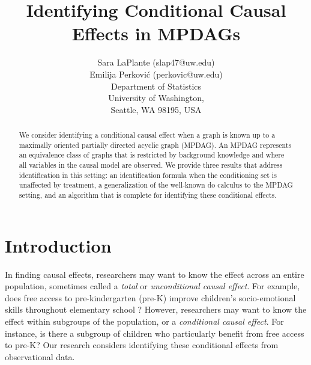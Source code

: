 \documentclass[11pt]{article}
\begin{document}
\title{Identifying Conditional Causal Effects in MPDAGs}

\author{Sara LaPlante  (slap47@uw.edu) \\
         Emilija Perkovi\'c  (perkovic@uw.edu) \\
         Department of Statistics\\
              University of Washington,\\
              Seattle, WA 98195, USA}
\date{}

\maketitle






\begin{abstract}%
    We consider identifying a conditional causal effect when a graph is known up to a maximally oriented partially directed acyclic graph (MPDAG). An MPDAG represents an equivalence class of graphs that is restricted by background knowledge and where all variables in the causal model are observed. We provide three results that address identification in this setting: an identification formula when the conditioning set is unaffected by treatment, a generalization of the well-known do calculus to the MPDAG setting, and an algorithm that is complete for identifying these conditional effects.
\end{abstract}







\section{Introduction}
\label{sec:intro}

In finding causal effects, researchers may want to know the effect across an entire population, sometimes called a \textit{total} or \textit{unconditional causal effect}. For example, does free access to pre-kindergarten (pre-K) improve children's socio-emotional skills throughout elementary school \citep{moffett2023enrollment}? However, researchers may want to know the effect within subgroups of the population, or a \textit{conditional causal effect}. For instance, is there a subgroup of children who particularly benefit from free access to pre-K? Our research considers identifying these conditional effects from observational data.
\end{document}
